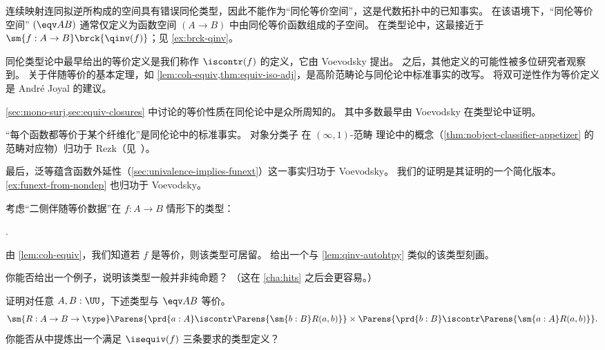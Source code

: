 \sectionNotes

连续映射连同拟逆所构成的空间具有错误同伦类型，因此不能作为“同伦等价空间”，这是代数拓扑中的已知事实。
在该语境下，“同伦等价空间” $(\eqv AB)$ 通常仅定义为函数空间 $(A\to B)$ 中由同伦等价函数组成的子空间。
在类型论中，这最接近于 $\sm{f:A\to B} \brck{\qinv(f)}$；见 \cref{ex:brck-qinv}。

同伦类型论中最早给出的等价定义是我们称作 $\iscontr(f)$ 的定义，它由 Voevodsky 提出。
之后，其他定义的可能性被多位研究者观察到。
关于伴随等价的基本定理，如 \cref{lem:coh-equiv,thm:equiv-iso-adj}，是高阶范畴论与同伦论中标准事实的改写。
将双可逆性作为等价定义是 Andr\'e Joyal 的建议。

\cref{sec:mono-surj,sec:equiv-closures} 中讨论的等价性质在同伦论中是众所周知的。
其中多数最早由 Voevodsky 在类型论中证明。

“每个函数都等价于某个纤维化”是同伦论中的标准事实。
对象分类子
%
%
在 $(\infty,1)$-范畴
%
理论中的概念（\cref{thm:nobject-classifier-appetizer} 的范畴对应物）归功于 Rezk（见~\cite{Rezk05,lurie:higher-topoi}）。

最后，泛等蕴含函数外延性（\cref{sec:univalence-implies-funext}）这一事实归功于 Voevodsky。
我们的证明是其证明的一个简化版本。
\cref{ex:funext-from-nondep} 也归功于 Voevodsky。

\sectionExercises

\begin{ex}\label{ex:two-sided-adjoint-equivalences}
  考虑“二侧伴随等价数据”在 $f:A\to B$ 情形下的类型：
  \begin{narrowmultline*}
    \narrowbreak
     \times
    .
  \end{narrowmultline*}
  由 \cref{lem:coh-equiv}，我们知道若 $f$ 是等价，则该类型可居留。
  给出一个与 \cref{lem:qinv-autohtpy} 类似的该类型刻画。

  你能否给出一个例子，说明该类型一般并非纯命题？
  （这在 \cref{cha:hits} 之后会更容易。）
\end{ex}

\begin{ex}\label{ex:symmetric-equiv}
  证明对任意 $A,B:\UU$，下述类型与 $\eqv A B$ 等价。
  \begin{equation*}
    \sm{R:A\to B\to \type}
    \Parens{\prd{a:A} \iscontr\Parens{\sm{b:B} R(a,b)}} \times
    \Parens{\prd{b:B} \iscontr\Parens{\sm{a:A} R(a,b)}}.
  \end{equation*}
  你能否从中提炼出一个满足 $\isequiv(f)$ 三条要求的类型定义？
\end{ex}

